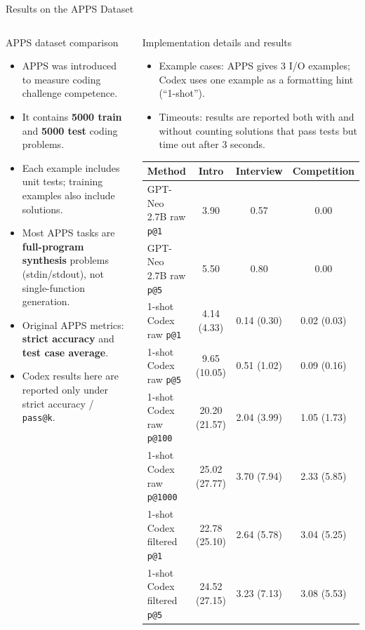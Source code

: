 \documentclass[aspectratio=43,9pt]{beamer}
\begin{document}
\begin{frame}{Results on the APPS Dataset}
\tiny
\begin{columns}[T,totalwidth=\textwidth]
\begin{block}{APPS dataset comparison}
\begin{itemize}
  \item APPS was introduced to measure coding challenge competence.
  \item It contains \textbf{5000 train} and \textbf{5000 test} coding problems.
  \item Each example includes unit tests; training examples also include solutions.
  \item Most APPS tasks are \textbf{full-program synthesis} problems (stdin/stdout), not single-function generation.
  \item Original APPS metrics: \textbf{strict accuracy} and \textbf{test case average}.
  \item Codex results here are reported only under strict accuracy / \texttt{pass@k}.
\end{itemize}
\end{block}

\begin{block}{Implementation details and results}
\begin{itemize}
  \item Example cases: APPS gives 3 I/O examples; Codex uses one example as a formatting hint (``1-shot'').
  \item Timeouts: results are reported both with and without counting solutions that pass tests but time out after 3 seconds.
\end{itemize}

\begin{tabular}{lccc}
\toprule
Method & Intro & Interview & Competition\\
\midrule
GPT-Neo 2.7B raw \texttt{p@1} & 3.90 & 0.57 & 0.00\\
GPT-Neo 2.7B raw \texttt{p@5} & 5.50 & 0.80 & 0.00\\
1-shot Codex raw \texttt{p@1} & 4.14 (4.33) & 0.14 (0.30) & 0.02 (0.03)\\
1-shot Codex raw \texttt{p@5} & 9.65 (10.05) & 0.51 (1.02) & 0.09 (0.16)\\
1-shot Codex raw \texttt{p@100} & 20.20 (21.57) & 2.04 (3.99) & 1.05 (1.73)\\
1-shot Codex raw \texttt{p@1000} & 25.02 (27.77) & 3.70 (7.94) & 2.33 (5.85)\\
1-shot Codex filtered \texttt{p@1} & 22.78 (25.10) & 2.64 (5.78) & 3.04 (5.25)\\
1-shot Codex filtered \texttt{p@5} & 24.52 (27.15) & 3.23 (7.13) & 3.08 (5.53)\\
\bottomrule
\end{tabular}


\end{block}
\end{columns}
\end{frame}
\end{document}

